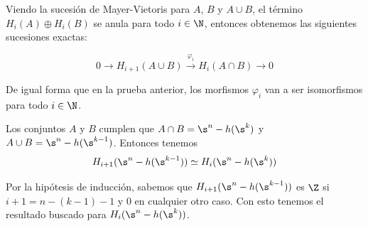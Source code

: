 \begin{dem}
\begin{dem}
    Viendo la sucesión de Mayer-Vietoris para $A$, $B$ y $A\cup B$, el término $H_i(A)\oplus H_i(B)$ se anula para todo $i\in\N$, entonces obtenemos las siguientes sucesiones exactas:

    $$0\rightarrow H_{i+1}(A\cup B)\xrightarrow{\varphi_i} H_{i}(A\cap B)\rightarrow 0$$

    De igual forma que en la prueba anterior, los morfismos $\varphi_i$ van a ser isomorfismos para todo $i\in\N$.

    Los conjuntos $A$ y $B$ cumplen que $A\cap B=\s^n - h(\s^k)$ y $A\cup B=\s^n-h(\s^{k-1})$. Entonces tenemos $$H_{i+1}(\s^n - h(\s^{k-1}))\simeq H_{i}(\s^n-h(\s^{k}))$$
    
    Por la hipótesis de inducción, sabemos que $H_{i+1}(\s^n-h(\s^{k-1}))$ es $\Z$ si $i + 1 = n- (k-1) -1$ y $0$ en cualquier otro caso. Con esto tenemos el resultado buscado para $H_{i}(\s^n-h(\s^{k}))$.

    \end{dem}


    
 


    
\end{dem}